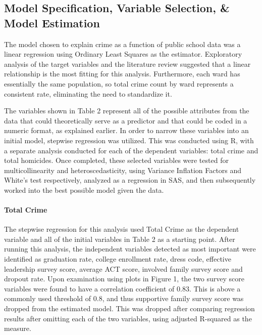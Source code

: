 \documentclass[12pt]{article}
\begin{document}
\subsection{Model Specification, Variable Selection, \& Model Estimation}

The model chosen to explain crime as a function of public school data was a linear regression using Ordinary Least Squares as the estimator.  Exploratory analysis of the target variables and the literature review suggested that a linear relationship is the most fitting for this analysis.  Furthermore, each ward has essentially the same population, so total crime count by ward represents a consistent rate, eliminating the need to standardize it.

\par

The variables shown in Table 2 represent all of the possible attributes from the data that could theoretically serve as a predictor and that could be coded in a numeric format, as explained earlier.  In order to narrow these variables into an initial model, stepwise regression was utilized.  This was conducted using R, with a separate analysis conducted for each of the dependent variables:  total crime and total homicides.  Once completed, these selected variables were tested for multicollinearity and heteroscedasticity, using Variance Inflation Factors and White's test respectively, analyzed as a regression in SAS, and then subsequently worked into the best possible model given the data.

\paragraph{Total Crime}

The stepwise regression for this analysis used Total Crime as the dependent variable and all of the initial variables in Table 2 as a starting point.  After running this analysis, the independent variables detected as most important were identified as graduation rate, college enrollment rate, dress code, effective leadership survey score, average ACT score, involved family survey score and dropout rate.  Upon examination using plots in Figure 1, the two survey score variables were found to have a correlation coefficient of 0.83.  This is above a commonly used threshold of 0.8, and thus supportive family survey score was dropped from the estimated model.  This was dropped after comparing regression results after omitting each of the two variables, using adjusted R-squared as the measure.
\end{document}

